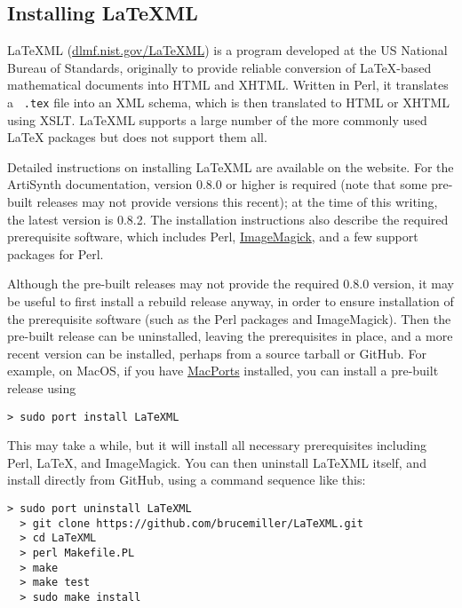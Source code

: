 \documentclass{article}
\begin{document}
\subsection{Installing LaTeXML}
\label{InstallingLaTeXMLSec}

LaTeXML (\href{http://dlmf.nist.gov/LaTeXML/}{dlmf.nist.gov/LaTeXML})
is a program developed at the US National Bureau of Standards,
originally to provide reliable conversion of LaTeX-based mathematical
documents into HTML and XHTML. Written in Perl, it translates a {\tt
.tex} file into an XML schema, which is then translated to HTML or
XHTML using XSLT. LaTeXML supports a large number of the more commonly
used LaTeX packages but does not support them all.

Detailed instructions on installing LaTeXML are available
on the website.  For the ArtiSynth documentation, version 0.8.0 or
higher is required (note that some pre-built releases may not provide
versions this recent); at the time of this writing, the latest version
is 0.8.2. The installation instructions also describe the required
prerequisite software, which includes Perl,
\href{http://www.imagemagick.org}{ImageMagick}, and a few support
packages for Perl.

Although the pre-built releases may not provide the required 0.8.0
version, it may be useful to first install a rebuild release anyway,
in order to ensure installation of the prerequisite software (such as
the Perl packages and ImageMagick). Then the pre-built release can be
uninstalled, leaving the prerequisites in place, and a more recent
version can be installed, perhaps from a source tarball or GitHub. For
example, on MacOS, if you have
\href{http://www.macports.org}{MacPorts} installed, you can install a
pre-built release using

\begin{lstlisting}[]
  > sudo port install LaTeXML
\end{lstlisting}

This may take a while, but it will install all necessary prerequisites
including Perl, LaTeX, and ImageMagick. You can then uninstall LaTeXML
itself, and install directly from GitHub, using a command
sequence like this:

\begin{lstlisting}[]
  > sudo port uninstall LaTeXML
  > git clone https://github.com/brucemiller/LaTeXML.git
  > cd LaTeXML
  > perl Makefile.PL
  > make
  > make test
  > sudo make install
\end{lstlisting}
\end{document}
